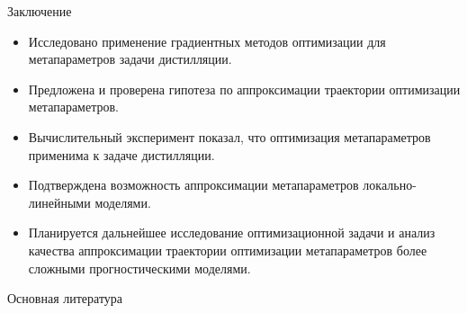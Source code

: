 \documentclass[12pt, aspectratio=169]{beamer}
\begin{document}
\begin{frame}{Заключение}
    \begin{itemize}
        \item Исследовано применение градиентных методов оптимизации для метапараметров задачи дистилляции. 
        \item Предложена и проверена гипотеза по аппроксимации траектории оптимизации метапараметров. 
        \item Вычислительный эксперимент показал, что оптимизация метапараметров применима к задаче дистилляции. 
        \item Подтверждена возможность аппроксимации метапараметров локально-линейными моделями. 
        \item Планируется дальнейшее исследование оптимизационной задачи и анализ качества  аппроксимации траектории оптимизации метапараметров более сложными прогностическими моделями.
    \end{itemize}
\end{frame}

\appendix
\begin{frame}[plain]{Основная литература}
    \printbibliography
\end{frame}

    


\end{document}
